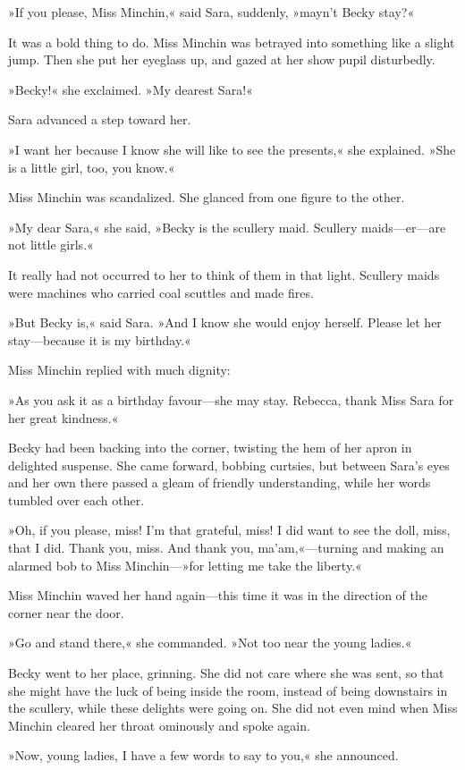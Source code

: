 »If you please, Miss Minchin,« said Sara, suddenly, »mayn't Becky stay?«

It was a bold thing to do. Miss Minchin was betrayed into something like a slight jump. Then she put her eyeglass up, and gazed at her show pupil disturbedly.

»Becky!« she exclaimed. »My dearest Sara!«

Sara advanced a step toward her.

»I want her because I know she will like to see the presents,« she explained. »She is a little girl, too, you know.«

Miss Minchin was scandalized. She glanced from one figure to the other.

»My dear Sara,« she said, »Becky is the scullery maid. Scullery maids—er—are not little girls.«

It really had not occurred to her to think of them in that light. Scullery maids were machines who carried coal scuttles and made fires.

»But Becky is,« said Sara. »And I know she would enjoy herself. Please let her stay—because it is my birthday.«

Miss Minchin replied with much dignity:

»As you ask it as a birthday favour—she may stay. Rebecca, thank Miss Sara for her great kindness.«

Becky had been backing into the corner, twisting the hem of her apron in delighted suspense. She came forward, bobbing curtsies, but between Sara's eyes and her own there passed a gleam of friendly understanding, while her words tumbled over each other.

»Oh, if you please, miss! I'm that grateful, miss! I did want to see the doll, miss, that I did. Thank you, miss. And thank you, ma'am,«—turning and making an alarmed bob to Miss Minchin—»for letting me take the liberty.«

Miss Minchin waved her hand again—this time it was in the direction of the corner near the door.

»Go and stand there,« she commanded. »Not too near the young ladies.«

Becky went to her place, grinning. She did not care where she was sent, so that she might have the luck of being inside the room, instead of being downstairs in the scullery, while these delights were going on. She did not even mind when Miss Minchin cleared her throat ominously and spoke again.

»Now, young ladies, I have a few words to say to you,« she announced.

